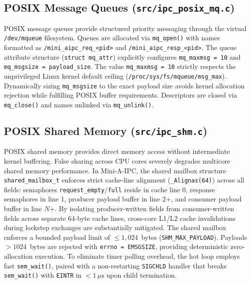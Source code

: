 \subsection{POSIX Message Queues (\texttt{src/ipc\_posix\_mq.c})}
POSIX message queues provide structured priority messaging through the virtual \texttt{/dev/mqueue} filesystem.
Queues are allocated via \texttt{mq\_open()} with names formatted as \texttt{/mini\_aipc\_req\_<pid>} and \texttt{/mini\_aipc\_resp\_<pid>}. The queue attribute structure (\texttt{struct mq\_attr}) explicitly configures \texttt{mq\_maxmsg = 10} and \texttt{mq\_msgsize = payload\_size}. The value \texttt{mq\_maxmsg = 10} strictly respects the unprivileged Linux kernel default ceiling (\texttt{/proc/sys/fs/mqueue/msg\_max}). Dynamically sizing \texttt{mq\_msgsize} to the exact payload size avoids kernel allocation rejection while fulfilling POSIX buffer requirements. Descriptors are closed via \texttt{mq\_close()} and names unlinked via \texttt{mq\_unlink()}.

\subsection{POSIX Shared Memory (\texttt{src/ipc\_shm.c})}
POSIX shared memory provides direct memory access without intermediate kernel buffering.
False sharing across CPU cores severely degrades multicore shared memory performance. In Mini-A-IPC, the shared mailbox structure \texttt{shared\_mailbox\_t} enforces strict cache-line alignment (\texttt{\_Alignas(64)}) across all fields: semaphores \texttt{request\_empty}/\texttt{full} reside in cache line 0, response semaphores in line 1, producer payload buffer in line 2+, and consumer payload buffer in line $N$+. By isolating producer-written fields from consumer-written fields across separate 64-byte cache lines, cross-core L1/L2 cache invalidations during lockstep exchanges are substantially mitigated.
The shared mailbox enforces a bounded payload limit of $\le 1,024$~bytes (\texttt{SHM\_MAX\_PAYLOAD}). Payloads $> 1024$~bytes are rejected with \texttt{errno = EMSGSIZE}, providing deterministic zero-allocation execution.
To eliminate timer polling overhead, the hot loop employs fast \texttt{sem\_wait()}, paired with a non-restarting \texttt{SIGCHLD} handler that breaks \texttt{sem\_wait()} with \texttt{EINTR} in $< 1\,\mu\text{s}$ upon child termination.

